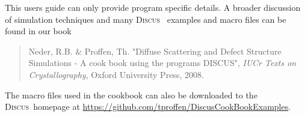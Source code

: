 \documentclass[11pt]{report}
\newcommand{\Discus}{\textsc{Discus\ }}
\begin{document}
This users guide can only provide program specific details. A
broader discussion of simulation techniques and many \Discus
examples and macro files can be found in our book

\begin{quote}
  {\sc Neder, R.B. \& Proffen, Th.} "Diffuse Scattering and Defect Structure
  Simulations - A cook book using the programs DISCUS", {\it IUCr Texts on
  Crystallography}, Oxford University Press, 2008.
\end{quote}


The macro files used in the cookbook can also be downloaded to the 
\Discus homepage at \url{https://github.com/tproffen/DiscusCookBookExamples}.


\tableofcontents

%
%













\appendix





\end{document}
